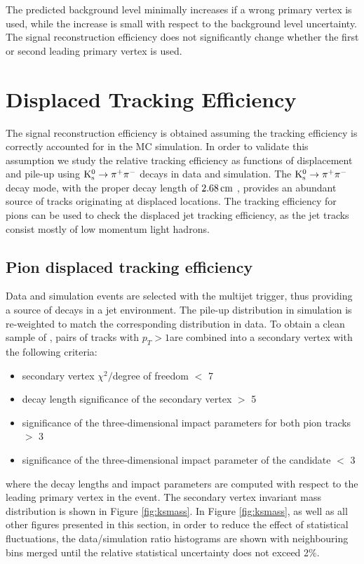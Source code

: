 The predicted background level minimally increases if a wrong primary vertex is used, while the increase is small
with respect to the background level uncertainty. The signal reconstruction efficiency 
does not significantly change whether the first or second leading primary vertex is used.

\section{Displaced Tracking Efficiency}

The signal reconstruction efficiency is obtained assuming the tracking efficiency is correctly 
accounted for in the MC simulation. In order to validate this assumption we study
the relative tracking efficiency as functions of displacement and pile-up using
$\mathrm{K}^0_\mathrm{s} \to \pi^+\pi^-$ decays in data and simulation.
The $\mathrm{K}^0_\mathrm{s} \to \pi^+\pi^-$ decay mode, with the \Kshort proper decay length of $2.68 \,\text{cm}$
 \cite{Beringer:1900zz}, provides an abundant source of tracks originating
at displaced locations. 
The tracking efficiency for \Kshort pions can be used to check the displaced jet tracking efficiency, 
as the jet tracks consist mostly of low momentum light hadrons. 

\subsection{Pion displaced tracking efficiency}
\label{subsec:pitrkeff}

Data and simulation events are selected with the multijet trigger, thus providing
a source of \Kshort decays in a jet environment. The pile-up distribution in simulation is re-weighted
to match the corresponding distribution in data. 
To obtain a clean sample of \Kshort, pairs of tracks with $p_T>1$\GeV are combined
 into a secondary 
vertex with the following criteria:
\begin{itemize}
 \item secondary vertex $\chi^2/$degree of freedom $<$ 7
 \item decay length significance of the secondary vertex $>$ 5
 \item significance of the three-dimensional impact parameters for both pion tracks $>$ 3
 \item significance of the three-dimensional impact parameter of the \Kshort candidate $<$ 3 
\end{itemize}
where the decay lengths and impact parameters are computed with respect to the leading primary vertex
in the event.
The secondary vertex invariant mass distribution is shown in Figure \ref{fig:ksmass}. 
In Figure \ref{fig:ksmass}, as well as all other figures
presented in this section, in order to reduce the effect of statistical fluctuations, 
the data/simulation ratio histograms are shown with neighbouring bins merged until the
relative statistical uncertainty does not exceed 2\%. 

